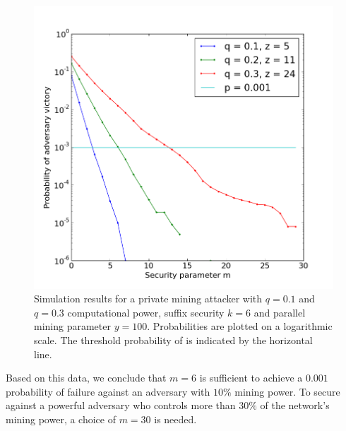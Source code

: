 \begin{figure}
    \caption{\label{fig.nipopow-attack-experiment}
        Simulation results for a private mining attacker with $q = 0.1$ and $q
        = 0.3$ computational power, suffix security $k = 6$ and parallel
        mining parameter $y = 100$. Probabilities are plotted on a logarithmic
        scale. The threshold probability of \cite{bitcoin} is indicated by the
        horizontal line.
    }
    \centering
    \includegraphics[width=\columnwidth,keepaspectratio]{figures/nipopow-attack-experiment.png}
\end{figure}

Based on this data, we conclude that $m = 6$ is sufficient to achieve a $0.001$
probability of failure against an adversary with $10\%$ mining power. To secure
against a powerful adversary who controls more than $30\%$ of the network's
mining power, a choice of $m = 30$ is needed.
